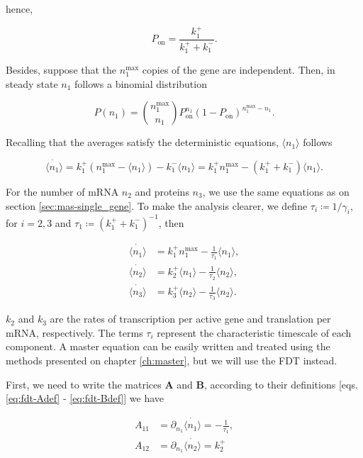 hence,

\begin{equation*}
  P_\text{on} = \frac{k_1^+}{k_1^++k_1^-}.
\end{equation*}

Besides, suppose that the $n_1^\text{max}$ copies of the gene are independent. Then, in steady state $n_1$ follows a binomial distribution

\begin{equation*}
  P(n_1) = {n_1^\text{max}\choose n_1} P_\text{on}^{n_1}(1-P_\text{on})^{n_1^\text{max}-n_1}.
\end{equation*}

Recalling that the averages satisfy the deterministic equations, $\langle n_1\rangle$ follows

\begin{equation*}
  \dot{\langle n_1\rangle} = k_1^+(n_1^\text{max}-\langle n_1\rangle) - k_1^-\langle n_1\rangle = k_1^+n_1^\text{max} - (k_1^++k_1^-)\langle n_1\rangle.
\end{equation*}

For the number of mRNA $n_2$ and proteins $n_3$, we use the same equations as on section \ref{sec:mas-single_gene}. To make the analysis clearer, we define $\tau_i\coloneqq 1/\gamma_i$, for $i=2,3$ and $\tau_1\coloneqq (k_1^++k_1^-)^{-1}$, then

\begin{equation}
  \begin{split}
    \dot{\langle n_1\rangle} &= k_1^+n_1^\text{max} - \frac{1}{\tau_1}\langle n_1\rangle,\\
    \dot{\langle n_2\rangle} &= k_2^+\langle n_1\rangle - \frac{1}{\tau_2}\langle n_2\rangle,\\
    \dot{\langle n_3\rangle} &= k_3^+\langle n_2\rangle - \frac{1}{\tau_3}\langle n_2\rangle.
  \end{split}
\end{equation}

$k_2$ and $k_3$ are the rates of transcription per active gene and translation per mRNA, respectively. The terms $\tau_i$ represent the characteristic timescale of each component. A master equation can be easily written and treated using the methods presented on chapter \ref{ch:master}, but we will use the FDT instead.

First, we need to write the matrices $\mathbf{A}$ and $\mathbf{B}$, according to their definitions [eqs. \eqref{eq:fdt-Adef} - \eqref{eq:fdt-Bdef}] we have

\begin{equation*}
  \begin{split}
    A_{11} &= \partial_{n_1}\dot{\langle n_1\rangle} =-\frac{1}{\tau_1},\\
    A_{12} &= \partial_{n_1}\dot{\langle n_2\rangle} = k_2^+
  \end{split}
\end{equation*}

